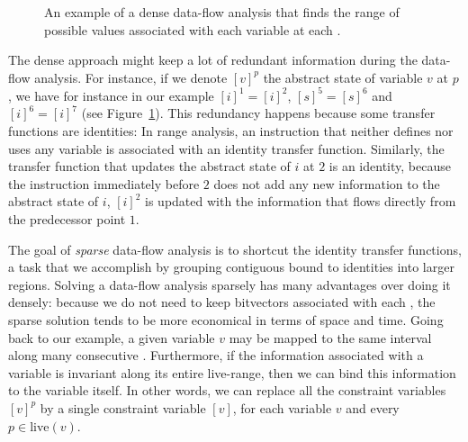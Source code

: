{\begin{figure}[t!]
\begin{minipage}[b]{0.2\textwidth}%
\end{minipage}
%
\hfill
%
  \useheightbox
%
\hfill
%
\centerheight{$%
  \begin{array}[b]{cc@{\quad}c}
    \textit{prog. point} & [i] & [s]\\[4pt] \hline\\[-4pt]
  0 & \top & \top\\
  1 & [0,0] & \top\\
  2 & [0,0] & [0,0]\\
  3 & [0,100] & [0, +\infty[\\
  4 & [100,100] & [0,+\infty[\\
  5 & [0,99] & [0,+\infty[\\
  6 & [0,100] & [0,+\infty[\\
  7 & [0,100] & [0,+\infty[\\
  \end{array}
$}
\caption{An example of a dense data-flow analysis that finds the range of
possible values associated with each variable at each \progpoint.}
\label{fig:rangeAnalysis}
\end{figure}

The dense approach might keep a lot of redundant information during the
data-flow analysis.
For instance, if we denote $[v]^p$ the abstract state of variable
$v$ at \progpoint $p$, we have for instance in our example $[i]^1 = [i]^2$,
$[s]^5 = [s]^6$ and $[i]^6 = [i]^7$ (see Figure~\ref{fig:rangeAnalysis}).
This redundancy happens because some transfer functions are identities:
In range analysis, an instruction that neither defines nor uses any variable is 
associated with an identity transfer function.
Similarly, the transfer function that updates the abstract state of $i$ at 
\progpoint $2$ is an identity, because the instruction immediately before $2$ 
does not add any new information to the abstract state of $i$, $[i]^2$ is 
updated with the information that flows directly from the predecessor point 
$1$.

The goal of \emph{sparse} data-flow analysis is to 
shortcut the identity transfer functions, a task that we accomplish by grouping 
contiguous \progpoints bound to identities into larger regions.
Solving a data-flow analysis sparsely has many advantages over doing it densely: because we do not need to keep bitvectors associated with each \progpoint, the sparse solution tends to be more economical in terms of space and time.
Going back to our example, a given variable $v$ may be mapped to the same interval along many consecutive \progpoints.
Furthermore, if the information associated with a variable is invariant along its
entire live-range, then we can bind this information to the variable itself.
In other words, we can replace all the constraint variables
$[v]^p$ by a single constraint variable $[v]$, for each variable $v$
and every $p\in \textrm{live}(v)$.

}

